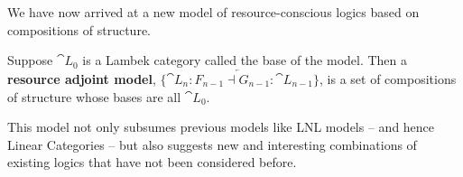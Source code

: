 We have now arrived at a new model of resource-conscious logics based
on compositions of structure.
\begin{definition}
  \label{def:resource-adjoint-model}
  Suppose $\cat{L}_0$ is a Lambek category called the base of the
  model.  Then a \textbf{resource adjoint model},
  $\{\overleftarrow{\cat{L}_n : F_{n-1} \dashv G_{n-1} : \cat{L}_{n-1}}\}$,
  is a set of compositions of structure whose bases are all $\cat{L}_0$.
\end{definition}


This model not only subsumes previous models like LNL models -- and
hence Linear Categories -- but also suggests new and interesting
combinations of existing logics that have not been considered before.


